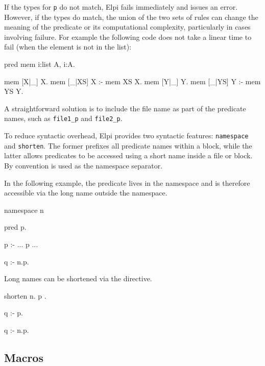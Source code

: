 \documentclass[a4paper, 11pt]{book}
\begin{document}
If the types for \texttt{p} do not match, Elpi fails immediately and issues an
error. However, if the types do match, the union of the two sets of
rules can change the meaning of the predicate or its computational complexity,
particularly in cases involving failure. For example the following code
does not take a linear time to fail (when the element is not in the list):

\begin{elpicode}
pred mem i:list A, i:A.

mem [X|_] X.
mem [_|XS] X :- mem XS X.
mem [Y|_] Y.
mem [_|YS] Y :- mem YS Y.
\end{elpicode}

A straightforward solution is to include the file name as part of the predicate
names, such as \texttt{file1\_p} and \texttt{file2\_p}.

To reduce syntactic overhead, Elpi provides two syntactic features:
\texttt{namespace} and \texttt{shorten}. The former prefixes all predicate
names within a block, while the latter allows predicates to be accessed using a
short name inside a file or block. By convention  is used as
the namespace separator.

In the following example, the predicate  lives in the namespace
 and is therefore accessible via the long name  outside the
namespace.

\begin{elpicode}
namespace n {

  pred p.

  p :- ... p ...

}

q :- n.p.
\end{elpicode}

\noindent
Long names can be shortened via the  directive.

\begin{elpicode}
shorten n.{ p }.

q :- p.

q :- n.p.
\end{elpicode}

\subsection{Macros}\label{sec:macros}
\end{document}
